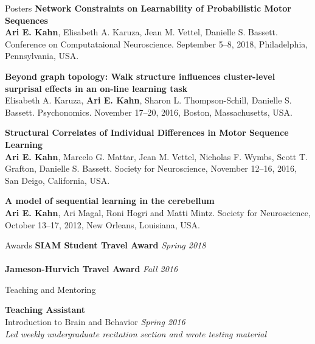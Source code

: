 \documentclass{resume} %
\begin{document}
\begin{rSection}{Posters}
\textbf{Network Constraints on Learnability of Probabilistic Motor Sequences} \\
\textbf{Ari E. Kahn}, Elisabeth A. Karuza, Jean M. Vettel, Danielle S. Bassett. Conference on Computataional Neuroscience. September 5--8, 2018, Philadelphia, Pennsylvania, USA.

\textbf{Beyond graph topology: Walk structure influences cluster-level surprisal effects in an on-line learning task} \\
Elisabeth A. Karuza, \textbf{Ari E. Kahn}, Sharon L. Thompson-Schill, Danielle S. Bassett. Psychonomics. November 17--20, 2016, Boston, Massachusetts, USA.

\textbf{Structural Correlates of Individual Differences in Motor Sequence Learning} \\
\textbf{Ari E. Kahn}, Marcelo G. Mattar, Jean M. Vettel, Nicholas F. Wymbs, Scott T. Grafton, Danielle S. Bassett. Society for Neuroscience, November 12--16, 2016, San Deigo, California, USA.

\textbf{A model of sequential learning in the cerebellum} \\
\textbf{Ari E. Kahn}, Ari Magal, Roni Hogri and Matti Mintz.
Society for Neuroscience, October 13--17, 2012, New Orleans, Louisiana, USA.
\end{rSection}

\begin{rSection}{Awards}
    \textbf{SIAM Student Travel Award} \hfill \emph{Spring 2018} \\
    \\
    \textbf{Jameson-Hurvich Travel Award} \hfill \emph{Fall 2016} \\
\end{rSection}


\begin{rSection}{Teaching and Mentoring}

\textbf{Teaching Assistant} \\
Introduction to Brain and Behavior \hfill \emph{Spring 2016} \\
\emph{Led weekly undergraduate recitation section and wrote testing material}
\end{rSection}
\end{document}
